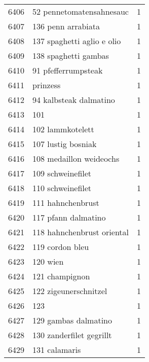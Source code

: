 \begin{tabular}{llr}
6406 &                           52 pennetomatensahnesauc &      1 \\
6407 &                                 136 penn arrabiata &      1 \\
6408 &                         137 spaghetti aglio e olio &      1 \\
6409 &                               138 spaghetti gambas &      1 \\
6410 &                                91 pfefferrumpsteak &      1 \\
6411 &                                           prinzess &      1 \\
6412 &                             94 kalbsteak dalmatino &      1 \\
6413 &                                                101 &      1 \\
6414 &                                   102 lammkotelett &      1 \\
6415 &                                 107 lustig bosniak &      1 \\
6416 &                            108 medaillon weideochs &      1 \\
6417 &                                  109 schweinefilet &      1 \\
6418 &                                  110 schweinefilet &      1 \\
6419 &                                  111 hahnchenbrust &      1 \\
6420 &                                117 pfann dalmatino &      1 \\
6421 &                         118 hahnchenbrust oriental &      1 \\
6422 &                                    119 cordon bleu &      1 \\
6423 &                                           120 wien &      1 \\
6424 &                                     121 champignon &      1 \\
6425 &                              122 zigeunerschnitzel &      1 \\
6426 &                                                123 &      1 \\
6427 &                               129 gambas dalmatino &      1 \\
6428 &                           130 zanderfilet gegrillt &      1 \\
6429 &                                      131 calamaris &      1 \\

\end{tabular}
